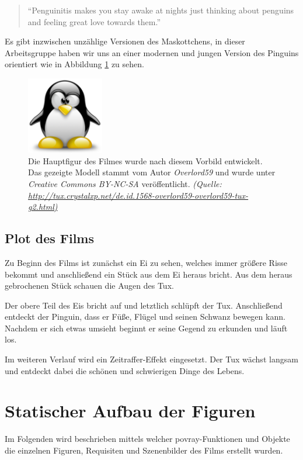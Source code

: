 \documentclass[11pt,parskip]{scrartcl}
\begin{document}
\begin{quote}
  \enquote{Penguinitis makes you stay awake at nights just thinking about
    penguins and feeling great love towards them.} \cite{tuxstory}
\end{quote}

Es gibt inzwischen unzählige Versionen des Maskottchens, in dieser
Arbeitsgruppe haben wir uns an einer modernen und jungen Version des Pinguins
orientiert wie in Abbildung \ref{fig:overlord59tux} zu sehen.

\begin{figure}[htbp]
  \centering
  \includegraphics[width=0.3\textwidth]{./fig/overlord59tux.pdf}
  \caption{
    Die Hauptfigur des Filmes wurde nach diesem Vorbild entwickelt. Das
    gezeigte Modell stammt vom Autor \emph{Overlord59} und wurde unter
    \emph{Creative Commons BY-NC-SA} veröffentlicht.
    \emph{
      (Quelle: \url{http://tux.crystalxp.net/de.id.1568-overlord59-overlord59-tux-g2.html)}
    }
  }
  \label{fig:overlord59tux}
\end{figure}


\subsection{Plot des Films}
Zu Beginn des Films ist zunächst ein Ei zu sehen, welches immer größere Risse
bekommt und anschließend ein Stück aus dem Ei heraus bricht. Aus dem
heraus gebrochenen Stück schauen die Augen des Tux.

Der obere Teil des Eis bricht auf und letztlich schlüpft der Tux. Anschließend
entdeckt der Pinguin, dass er Füße, Flügel und seinen Schwanz bewegen kann.
Nachdem er sich etwas umsieht beginnt er seine Gegend zu erkunden und läuft
los.

Im weiteren Verlauf wird ein Zeitraffer-Effekt eingesetzt. Der Tux wächst
langsam und entdeckt dabei die schönen und schwierigen Dinge des Lebens.


\newpage

\section{Statischer Aufbau der Figuren}
Im Folgenden wird beschrieben mittels welcher povray-Funktionen und Objekte die
einzelnen Figuren, Requisiten und Szenenbilder des Films erstellt wurden.
\end{document}
